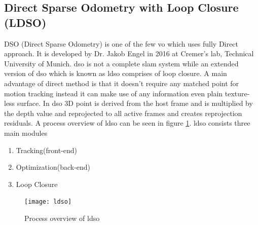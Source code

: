 \subsection{Direct Sparse Odometry with Loop Closure (LDSO)}
DSO (Direct Sparse Odometry) is one of the few \acrshort{vo} which uses fully Direct approach. It is developed by Dr. Jakob Engel in 2016 at Cremer's lab, Technical University of Munich.
\acrshort{dso} is not a complete \acrshort{slam} system while an extended version of \acrshort{dso} which is known as \acrshort{ldso} \cite{gao2018ldso} comprises of loop closure. 
A main advantage of direct method is that it doesn't require any matched point for motion tracking instead it can make use of any information even plain texture-less surface. In \acrshort{dso} 3D point is derived from the host frame and is multiplied by the depth value and reprojected to all active frames and creates reprojection residuals. A process overview of \acrshort{ldso} can be seen in figure \ref{fig:ldso}. \acrshort{ldso} consists three main modules 
\begin{enumerate}
	\item Tracking(front-end)
	\item Optimization(back-end)
	\item Loop Closure
\end{enumerate}
\begin{figure}[h!]
	\centering
	\texttt{[image: ldso]}
	\caption{Process overview of \acrshort{ldso}}
	\label{fig:ldso}
\end{figure}
